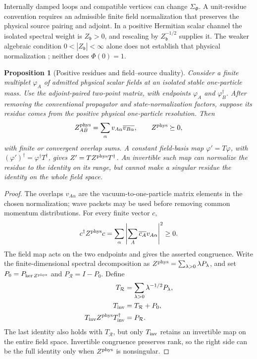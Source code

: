 \documentclass[final,5p,times,twocolumn,numbers,nopreprintline]{elsarticle}
\numberwithin{equation}{section}
\newtheorem{proposition}[theorem]{Proposition}
\theoremstyle{definition}
\theoremstyle{remark}
\newcommand{\bb}{\mathfrak b}
\newcommand{\Ph}{\Phi}
\begin{document}
Internally damped loops and compatible vertices can change
\(\Sigma_\Ph\). A unit-residue convention requires an admissible
finite field normalization that preserves the physical source
pairing and adjoint. In a positive Hermitian scalar channel the
isolated spectral weight is \(Z_{\bb}>0\), and rescaling by
\(Z_{\bb}^{-1/2}\) supplies it. The weaker algebraic condition
\(0<|Z_{\bb}|<\infty\) alone does not establish that physical
normalization \cite{LSZ1955}; neither does \(\Ph(0)=1\).

\begin{proposition}[Positive residues and field--source duality]
\label{prop:positive-residue-matrix}
Consider a finite multiplet \(\varphi_A\) of admitted physical scalar
fields at an isolated stable one-particle mass. Use the adjoint-paired
two-point matrix, with endpoints \(\varphi_A\) and
\(\varphi_B^\dagger\). After removing the conventional propagator
and state-normalization factors, suppose its residue comes from the
positive physical one-particle resolution. Then
\begin{equation}
 Z^{\rm phys}_{AB}
       =\sum_\alpha v_{A\alpha}\overline{v_{B\alpha}},
 \qquad Z^{\rm phys}\succeq0,
 \label{eq:positive-pole-Gram-matrix}
\end{equation}
with finite or convergent overlap sums. A constant field-basis map
\(\varphi'=T\varphi\), with
\((\varphi')^\dagger=\varphi^\dagger T^\dagger\), gives
\(Z'=T Z^{\rm phys}T^\dagger\). An invertible such map can
normalize the residue to the identity on its range, but cannot make
a singular residue the identity on the whole field space.
\end{proposition}

\begin{proof}
The overlaps \(v_{A\alpha}\) are the vacuum-to-one-particle
matrix elements in the chosen normalization; wave packets may be
used before removing common momentum distributions. For every finite
vector \(c\),
\[
 c^\dagger Z^{\rm phys}c
       =\sum_\alpha\left|\sum_A\overline{c_A}v_{A\alpha}\right|^2
       \geq0.
\]
The field map acts on the two endpoints and gives the asserted
congruence. Write the finite-dimensional spectral decomposition as
\(Z^{\rm phys}=\sum_{\lambda>0}\lambda P_\lambda\), and set
\(P_0=P_{\ker Z^{\rm phys}}\) and
\(P_{\mathcal R}=I-P_0\). Define
\begin{equation}
 \begin{aligned}
  T_{\mathcal R}&=\sum_{\lambda>0}\lambda^{-1/2}P_\lambda,\\
  T_{\rm inv}&=T_{\mathcal R}+P_0,\\
  T_{\rm inv}Z^{\rm phys}T_{\rm inv}^\dagger&=P_{\mathcal R}.
 \end{aligned}
 \label{eq:invertible-residue-normalization}
\end{equation}
The last identity also holds with \(T_{\mathcal R}\), but only
\(T_{\rm inv}\) retains an invertible map on the entire field space.
Invertible congruence preserves rank, so the right side can be the
full identity only when \(Z^{\rm phys}\) is nonsingular.
\end{proof}
\end{document}
